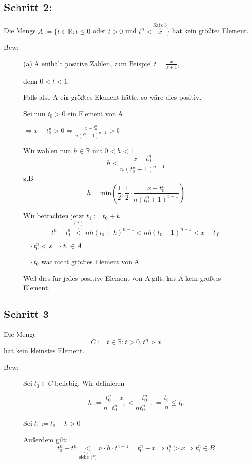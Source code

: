 \documentclass[12pt,a4paper,leqno]{article}
\begin{document}
  
  \subsection*{Schritt 2:} 
  Die Menge $A:=\lbrace t\in \mathbb{R}:t\leq0 $ oder $ t>0 $ und $t^{n}<\overbrace{x}^{\textrm{Satz 3}}\rbrace$
  hat kein größtes Element.
  
  \begin{description}
    \item[Bew:] (a) A enthält positive Zahlen, zum Beispiel $t=\frac{x}{x+1}$,
      
      denn $0<t<1$.
      
      Falls also A ein größtes Element hätte, so wäre dies positiv.
      
      Sei nun $t_0>0$ ein Element von A 
      
      $\Rightarrow x-t_0^{n}>0 \Rightarrow \frac{x-t_0^{n}}{n(t_0^{n}+1)^{n-1}}>0$  
      
      Wir wählen nun $h \in\mathbb{R}$ mit $0<h<1$
      $$ h<\frac{x-t_0^{n}}{n(t_0^n+1)^{n-1}}$$
      z.B. $$h=\textrm{min}\left(\frac{1}{2},\frac{1}{2} \cdot \frac{x-t_0^{n}}{n(t_0^{n}+1)^{n-1}} \right)$$
      
      Wir betrachten jetzt $t_1:=t_0+h$
      $$ t_1^{n}-t_0^{n}\overbrace{<}^{(*)}n h (t_0+h)^{n-1}<n h (t_0+1)^{n-1}<x-t_{0^{n}}$$
      
      $\Rightarrow t_0^{n}<x \Rightarrow t_1 \in A$
      
      $\Rightarrow t_0$ war nicht größtes Element von A
      
      Weil dies für jedes positive Element von A gilt, hat A kein größtes Element. 
  \end{description}
  
  
  \subsection*{Schritt 3}
  
  Die Menge 
  \begin{displaymath}
    C := { t \in \mathbb{R}: t > 0, t^n>x}
  \end{displaymath}
  hat kein kleinstes Element.
  
  \begin{description}
    \item[Bew:] Sei $t_0 \in C$ beliebig. Wir definieren 
      
      $$h := \frac{t_0^n-x}{n \cdot t_0^{n-1}} < \frac{t_0^n}{nt_0^{n-1}} = \frac{t_0}{n} \leq t_0$$
      
      
      Sei $t_1 := t_0 - h > 0$
      
      Außerdem gilt: 
      $$t_0^n - t_1^n \underbrace{<}_{\textrm{siehe (*)}} n \cdot h \cdot t_0^{n-1} = t_0^n - x \Rightarrow t_1^n > x \Rightarrow t_1^n \in B$$
      
  \end{description}
  
\end{document}
